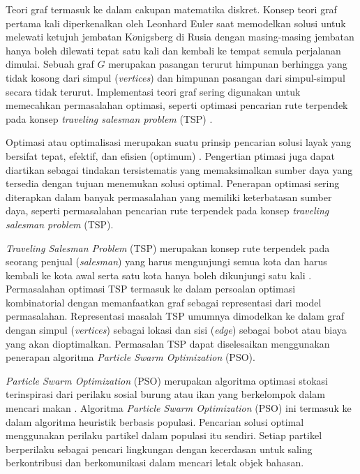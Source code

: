 {    %
    Teori graf termasuk ke dalam cakupan matematika diskret. Konsep teori graf pertama kali diperkenalkan oleh Leonhard Euler saat memodelkan solusi
    untuk melewati ketujuh jembatan K$\ddot{o}$nigsberg di Rusia dengan masing-masing jembatan hanya boleh dilewati tepat satu kali dan kembali ke tempat semula perjalanan dimulai.
    Sebuah graf $G$ merupakan pasangan terurut himpunan berhingga yang tidak kosong dari simpul (\textit{vertices}) dan himpunan pasangan dari simpul-simpul secara tidak terurut.
    Implementasi teori graf sering digunakan untuk memecahkan permasalahan optimasi, seperti optimasi pencarian rute terpendek pada konsep \textit{traveling salesman problem} (TSP) .

    Optimasi atau optimalisasi merupakan suatu prinsip pencarian solusi layak yang bersifat tepat, efektif, dan efisien (optimum) .
    Pengertian ptimasi juga dapat diartikan sebagai tindakan tersistematis yang memaksimalkan sumber daya yang tersedia dengan tujuan menemukan solusi optimal.
    Penerapan optimasi sering diterapkan dalam banyak permasalahan yang memiliki keterbatasan sumber daya, seperti permasalahan pencarian rute terpendek pada konsep \textit{traveling salesman problem} (TSP).

    \textit{Traveling Salesman Problem} (TSP) merupakan konsep rute terpendek pada seorang penjual (\textit{salesman}) yang harus mengunjungi semua kota dan harus kembali ke kota awal serta satu kota hanya boleh dikunjungi satu kali .
    Permasalahan optimasi TSP termasuk ke dalam persoalan optimasi kombinatorial dengan memanfaatkan graf sebagai representasi dari model permasalahan.
    Representasi masalah TSP umumnya dimodelkan ke dalam graf dengan simpul (\textit{vertices}) sebagai lokasi dan sisi (\textit{edge}) sebagai bobot atau biaya yang akan dioptimalkan.
    Permasalan TSP dapat diselesaikan menggunakan penerapan algoritma \textit{Particle Swarm Optimization} (PSO).

    \textit{Particle Swarm Optimization} (PSO) merupakan algoritma optimasi stokasi terinspirasi dari perilaku sosial burung atau ikan yang berkelompok dalam mencari makan .
    Algoritma \textit{Particle Swarm Optimization} (PSO) ini termasuk ke dalam algoritma heuristik berbasis populasi.
    Pencarian solusi optimal menggunakan perilaku partikel dalam populasi itu sendiri.
    Setiap partikel berperilaku sebagai pencari lingkungan dengan kecerdasan untuk saling berkontribusi dan berkomunikasi dalam mencari letak objek bahasan.

}
